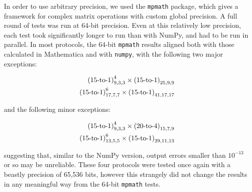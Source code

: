 \documentclass{report}
\begin{document}
In order to use arbitrary precision, we used the \texttt{mpmath} package, which gives a framework for complex matrix operations with custom global precision. A full round of tests was run at 64-bit precision. Even at this relatively low precision, each test took significantly longer to run than with NumPy, and had to be run in parallel. In most protocols, the 64-bit \texttt{mpmath} results aligned both with those calculated in Mathematica and with \texttt{numpy}, with the following two major exceptions:

\begin{align*}
    \textnormal{(15-to-1)}^4_{9,3,3} \times \textnormal{(15-to-1)}_{25,9,9}
    \\
    \textnormal{(15-to-1)}^6_{17,7,7}\times \textnormal{(15-to-1)}_{41,17,17}
\end{align*}

and the following minor exceptions:

\begin{align*}
    \textnormal{(15-to-1)}_{9,3,3}^4 \times \textnormal{(20-to-4)}_{15,7,9}
    \\
    \textnormal{(15-to-1)}^6_{13,5,5}\times \textnormal{(15-to-1)}_{29,11,13}
\end{align*} 

suggesting that, similar to the NumPy version, output errors smaller than $10^{-13}$ or so may be unreliable. These four protocols were tested once again with a beastly precision of 65,536 bits, however this strangely did not change the results in any meaningful way from the 64-bit \texttt{mpmath} tests.


\vspace{10px}
\end{document}
